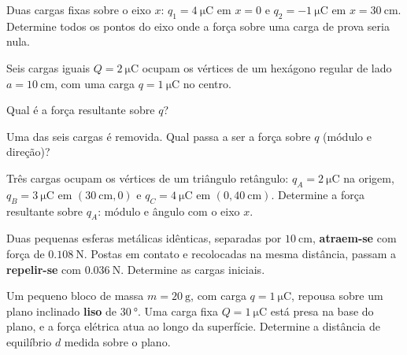 \blocoaprofundamento
\begin{questao}[3]{}

Duas cargas fixas sobre o eixo $x$: $q_1=\SI{+4}{\micro\coulomb}$ em $x=0$ e
$q_2=\SI{-1}{\micro\coulomb}$ em $x=\SI{30}{\centi\meter}$. Determine todos os
pontos do eixo onde a força sobre uma carga de prova seria nula.


\end{questao}
\begin{questao}[3]{}

Seis cargas iguais $Q=\SI{2}{\micro\coulomb}$ ocupam os vértices de um hexágono
regular de lado $a=\SI{10}{\centi\meter}$, com uma carga
$q=\SI{1}{\micro\coulomb}$ no centro.
\begin{itensq}
\item Qual é a força resultante sobre $q$?
\item Uma das seis cargas é removida. Qual passa a ser a força sobre $q$
      (módulo e direção)?
\end{itensq}


\end{questao}
\begin{questao}[3]{}

Três cargas ocupam os vértices de um triângulo retângulo:
$q_A=\SI{+2}{\micro\coulomb}$ na origem, $q_B=\SI{+3}{\micro\coulomb}$ em
$(\SI{30}{\centi\meter},0)$ e $q_C=\SI{+4}{\micro\coulomb}$ em
$(0,\SI{40}{\centi\meter})$. Determine a força resultante sobre $q_A$: módulo e
ângulo com o eixo $x$.


\end{questao}
\begin{questao}[3]{}

Duas pequenas esferas metálicas idênticas, separadas por $\SI{10}{\centi\meter}$,
\textbf{atraem-se} com força de $\SI{0.108}{\newton}$. Postas em contato e
recolocadas na mesma distância, passam a \textbf{repelir-se} com
$\SI{0.036}{\newton}$. Determine as cargas iniciais.


\end{questao}
\begin{questao}[3]{}

Um pequeno bloco de massa $m=\SI{20}{\gram}$, com carga $q=\SI{1}{\micro\coulomb}$,
repousa sobre um plano inclinado \textbf{liso} de $\SI{30}{\degree}$. Uma carga fixa
$Q=\SI{1}{\micro\coulomb}$ está presa na base do plano, e a força elétrica atua
ao longo da superfície. Determine a distância de equilíbrio $d$ medida sobre o
plano.


\end{questao}
